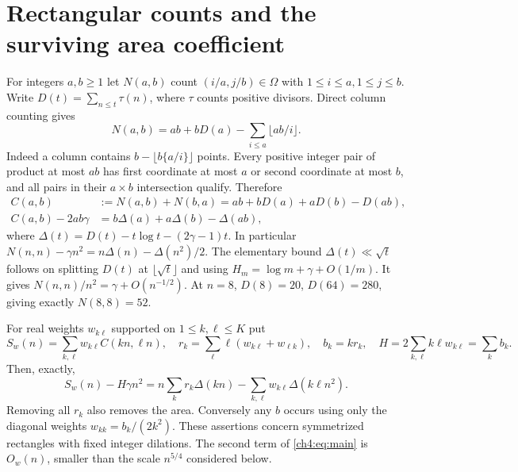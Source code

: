 \documentclass[11pt,a4paper,oneside,openany]{report}
\theoremstyle{remark}\newtheorem{remark}[theorem]{Remark}
\numberwithin{equation}{section}
\begin{document}
\section{Rectangular counts and the surviving area coefficient}\label{ch4:sec:rect}
For integers $a,b\ge1$ let $N(a,b)$ count $(i/a,j/b)\in\Omega$ with $1\le i\le a,1\le j\le b$. Write $D(t)=\sum_{n\le t}\tau(n)$, where $\tau$ counts positive divisors. Direct column counting gives
\[
 N(a,b)=ab+bD(a)-\sum_{i\le a}\lfloor ab/i\rfloor .
\]
Indeed a column contains $b-\lfloor b\{a/i\}\rfloor$ points. Every positive integer pair of product at most $ab$ has first coordinate at most $a$ or second coordinate at most $b$, and all pairs in their $a\times b$ intersection qualify. Therefore
\begin{align}
 C(a,b)&:=N(a,b)+N(b,a)=ab+bD(a)+aD(b)-D(ab),\label{ch4:eq:C}\\
 C(a,b)-2ab\gamma&=b\Delta(a)+a\Delta(b)-\Delta(ab),\label{ch4:eq:delta}
\end{align}
where $\Delta(t)=D(t)-t\log t-(2\gamma-1)t$. In particular $N(n,n)-\gamma n^2=n\Delta(n)-\Delta(n^2)/2$. The elementary bound $\Delta(t)\ll\sqrt t$ follows on splitting $D(t)$ at $\lfloor\sqrt t\rfloor$ and using $H_m=\log m+\gamma+O(1/m)$. It gives $N(n,n)/n^2=\gamma+O(n^{-1/2})$. At $n=8$, $D(8)=20$, $D(64)=280$, giving exactly $N(8,8)=52$.

For real weights $w_{k\ell}$ supported on $1\le k,\ell\le K$ put
\[
 S_w(n)=\sum_{k,\ell}w_{k\ell} C(kn,\ell n),\quad
 r_k=\sum_\ell \ell(w_{k\ell}+w_{\ell k}),\quad b_k=k r_k,\quad
 H=2\sum_{k,\ell}k\ell w_{k\ell}=\sum_k b_k .
\]
Then, exactly,
\begin{equation}\label{ch4:eq:main}
 S_w(n)-H\gamma n^2=n\sum_k r_k\Delta(kn)-\sum_{k,\ell} w_{k\ell}\Delta(k\ell n^2).
\end{equation}
Removing all $r_k$ also removes the area. Conversely any $b$ occurs using only the diagonal weights $w_{kk}=b_k/(2k^2)$. These assertions concern symmetrized rectangles with fixed integer dilations. The second term of \eqref{ch4:eq:main} is $O_w(n)$, smaller than the scale $n^{5/4}$ considered below.
\end{document}
